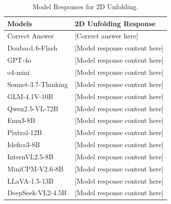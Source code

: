 \begin{table}[h]
\setlength{\tabcolsep}{3mm}
\centering
\small
\begin{tabular}{l|p{12cm}}
\toprule
\textbf{Models} & \textbf{2D Unfolding Response} \\
\midrule
Correct Answer & [Correct answer here]\\
\midrule
Doubao1.6-Flash & [Model response content here] \\
\midrule
GPT-4o & [Model response content here] \\
\midrule
o4-mini & [Model response content here] \\
\midrule
Sonnet-3.7-Thinking & [Model response content here] \\
\midrule
GLM-4.1V-10B & [Model response content here] \\
\midrule
Qwen2.5-VL-72B & [Model response content here] \\
Emu3-8B & [Model response content here] \\
Pixtral-12B & [Model response content here] \\
Idefics3-8B & [Model response content here] \\
InternVL2.5-8B & [Model response content here] \\
MiniCPM-V2.6-8B & [Model response content here] \\
LLaVA-1.5-13B & [Model response content here] \\
DeepSeek-VL2-4.5B & [Model response content here] \\
\bottomrule
\end{tabular}
\begin{center}
\caption{Model Responses for 2D Unfolding.}
\end{center}
\label{tab:task5_responses}
\end{table}